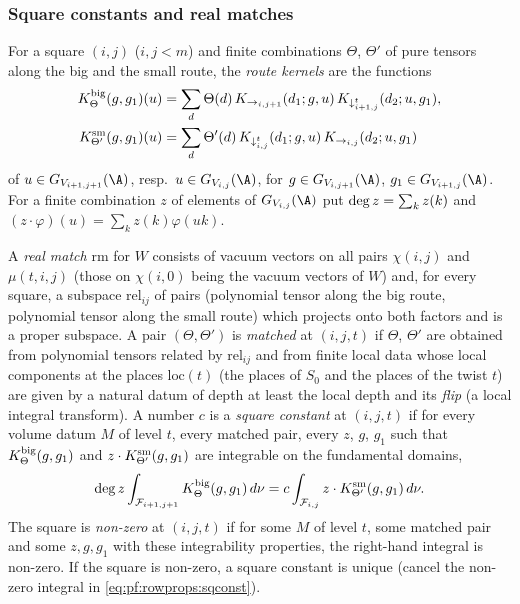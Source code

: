\subsubsection{Square constants and real matches}
For a square $(i,j)$ ($i,j<m$) and finite combinations $\Theta$, $\Theta'$ of pure tensors along the big and the small
route, the \emph{route kernels} are the functions
\begin{align*}
K^{\mathrm{big}}_\Theta(g,g_1)(u)&=\sum_d\Theta(d)\,K_{\rightarrow_{i,j+1}}(d_1;g,u)\,K_{\downarrow^t_{i+1,j}}(d_2;u,g_1),\\
K^{\mathrm{sm}}_{\Theta'}(g,g_1)(u)&=\sum_d\Theta'(d)\,K_{\downarrow^t_{i,j}}(d_1;g,u)\,K_{\rightarrow_{i,j}}(d_2;u,g_1)
\end{align*}
of $u\in G_{V_{i+1,j+1}}(\A)$, resp.\ $u\in G_{V_{i,j}}(\A)$, for $g\in G_{V_{i,j+1}}(\A)$, $g_1\in G_{V_{i+1,j}}(\A)$.
For a finite combination $z$ of elements of $G_{V_{i,j}}(\A)$ put $\deg z=\sum_k z(k)$ and
$(z\cdot\varphi)(u)=\sum_kz(k)\varphi(uk)$.

\begin{definition}\label{def:pf:rowprops:square}
A \emph{real match} $\mathrm{rm}$ for $W$ consists of vacuum vectors on all pairs $\chi(i,j)$ and $\mu(t,i,j)$
(those on $\chi(i,0)$ being the vacuum vectors of $W$) and, for every square, a subspace $\mathrm{rel}_{ij}$ of pairs
(polynomial tensor along the big route, polynomial tensor along the small route) which projects onto both factors and
is a proper subspace. A pair $(\Theta,\Theta')$ is \emph{matched} at $(i,j,t)$ if $\Theta$, $\Theta'$ are obtained from
polynomial tensors related by $\mathrm{rel}_{ij}$ and from finite local data whose local components at the places
$\mathrm{loc}(t)$ (the places of $S_0$ and the places of the twist $t$) are given by a natural datum of depth at least the
local depth and its \emph{flip} (a local integral transform). A number $c$ is a
\emph{square constant} at $(i,j,t)$ if for every volume datum $M$ of level $t$, every matched pair, every $z$, $g$, $g_1$
such that $K^{\mathrm{big}}_\Theta(g,g_1)$ and $z\cdot K^{\mathrm{sm}}_{\Theta'}(g,g_1)$ are integrable on the fundamental
domains,
\begin{equation}\label{eq:pf:rowprops:sqconst}
\deg z\int_{\mathcal{F}_{i+1,j+1}}K^{\mathrm{big}}_\Theta(g,g_1)\,d\nu
=c\int_{\mathcal{F}_{i,j}}z\cdot K^{\mathrm{sm}}_{\Theta'}(g,g_1)\,d\nu .
\end{equation}
The square is \emph{non-zero} at $(i,j,t)$ if for some $M$ of level $t$, some matched pair and some $z,g,g_1$ with these
integrability properties, the right-hand integral is non-zero. If the square is non-zero, a square constant is unique
(cancel the non-zero integral in \eqref{eq:pf:rowprops:sqconst}).
\end{definition}

